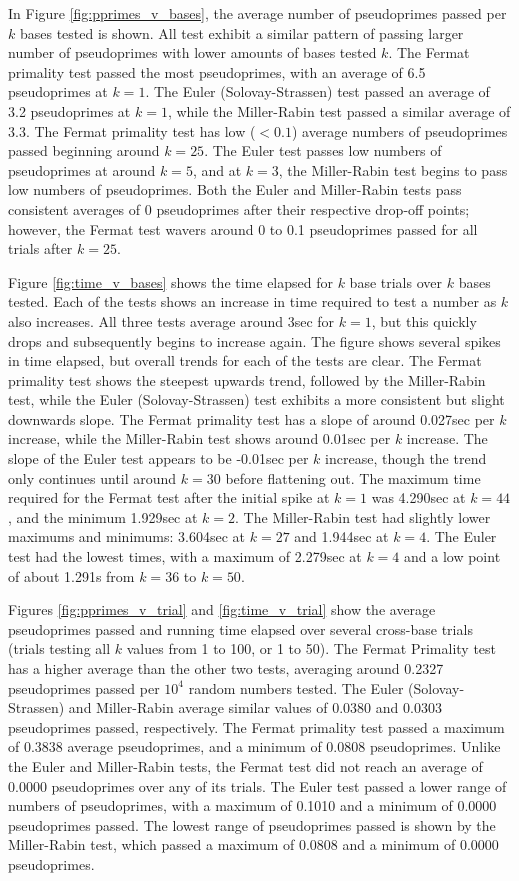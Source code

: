 \documentclass{article}
\begin{document}
In Figure \ref{fig:pprimes_v_bases}, the average number of pseudoprimes passed per $k$ bases tested is shown. All test exhibit a similar pattern of passing larger number of pseudoprimes with lower amounts of bases tested $k$. The Fermat primality test passed the most pseudoprimes, with an average of 6.5 pseudoprimes at $k = 1$. The Euler (Solovay-Strassen) test passed an average of 3.2 pseudoprimes at $k = 1$, while the Miller-Rabin test passed a similar average of 3.3. The Fermat primality test has low ($<0.1$) average numbers of pseudoprimes passed beginning around $k = 25$. The Euler test passes low numbers of pseudoprimes at around $k = 5$, and at $k = 3$, the Miller-Rabin test begins to pass low numbers of pseudoprimes. Both the Euler and Miller-Rabin tests pass consistent averages of 0 pseudoprimes after their respective drop-off points; however, the Fermat test wavers around 0 to 0.1 pseudoprimes passed for all trials after $k = 25$.

Figure \ref{fig:time_v_bases} shows the time elapsed for $k$ base trials over $k$ bases tested. Each of the tests shows an increase in time required to test a number as $k$ also increases. All three tests average around 3sec for $k = 1$, but this quickly drops and subsequently begins to increase again. The figure shows several spikes in time elapsed, but overall trends for each of the tests are clear. The Fermat primality test shows the steepest upwards trend, followed by the Miller-Rabin test, while the Euler (Solovay-Strassen) test exhibits a more consistent but slight downwards slope. The Fermat primality test has a slope of around 0.027sec per $k$ increase, while the Miller-Rabin test shows around 0.01sec per $k$ increase. The slope of the Euler test appears to be -0.01sec per $k$ increase, though the trend only continues until around $k=30$ before flattening out. The maximum time required for the Fermat test after the initial spike at $k=1$ was 4.290sec at $k=44$, and the minimum 1.929sec at $k=2$. The Miller-Rabin test had slightly lower maximums and minimums: 3.604sec at $k=27$ and 1.944sec at $k=4$. The Euler test had the lowest times, with a maximum of 2.279sec at $k=4$ and a low point of about 1.291s from $k=36$ to $k=50$.

Figures \ref{fig:pprimes_v_trial} and \ref{fig:time_v_trial} show the average pseudoprimes passed and running time elapsed over several cross-base trials (trials testing all $k$ values from 1 to 100, or 1 to 50). The Fermat Primality test has a higher average than the other two tests, averaging around 0.2327 pseudoprimes passed per $10^4$ random numbers tested. The Euler (Solovay-Strassen) and Miller-Rabin average similar values of 0.0380 and 0.0303 pseudoprimes passed, respectively. The Fermat primality test passed a maximum of 0.3838 average pseudoprimes, and a minimum of 0.0808 pseudoprimes. Unlike the Euler and Miller-Rabin tests, the Fermat test did not reach an average of 0.0000 pseudoprimes over any of its trials. The Euler test passed a lower range of numbers of pseudoprimes, with a maximum of 0.1010 and a minimum of 0.0000 pseudoprimes passed. The lowest range of pseudoprimes passed is shown by the Miller-Rabin test, which passed a maximum of 0.0808 and a minimum of 0.0000 pseudoprimes.
\end{document}
